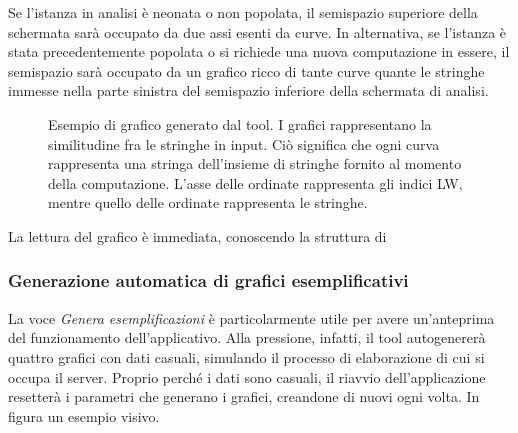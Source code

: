 Se l'istanza in analisi è neonata o non popolata, il semispazio superiore della schermata sarà occupato da due assi esenti da curve. In alternativa, se l'istanza è stata precedentemente popolata o si richiede una nuova computazione in essere, il semispazio sarà occupato da un grafico ricco di tante curve quante le stringhe immesse nella parte sinistra del semispazio inferiore della schermata di analisi.

\begin{figure}[ht!]
    \centering
    \caption{Esempio di grafico generato dal tool. I grafici rappresentano la similitudine fra le stringhe in input. Ciò significa che ogni curva rappresenta una stringa dell'insieme di stringhe fornito al momento della computazione. L'asse delle ordinate rappresenta gli indici LW, mentre quello delle ordinate rappresenta le stringhe.}
    \label{fig:esempio}
\end{figure}

La lettura del grafico è immediata, conoscendo la struttura di 

\subsubsection{Generazione automatica di grafici esemplificativi}

La voce \textit{Genera esemplificazioni} è particolarmente utile per avere un'anteprima del funzionamento dell'applicativo. Alla pressione, infatti, il tool autogenererà quattro grafici con dati casuali, simulando il processo di elaborazione di cui si occupa il server. Proprio perché i dati sono casuali, il riavvio dell'applicazione resetterà i parametri che generano i grafici, creandone di nuovi ogni volta. In figura un esempio visivo.

